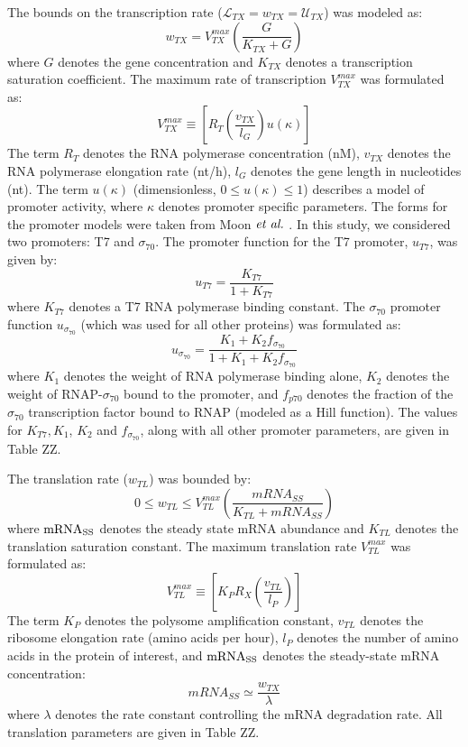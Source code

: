 \documentclass[journal=asbcd6,manuscript=article]{achemso}
\begin{document}
The bounds on the transcription rate ($\mathcal{L}_{TX}=w_{TX}=\mathcal{U}_{TX}$) was modeled as:
\begin{equation}
	w_{TX} = V_{TX}^{max}\left(\frac{G}{K_{TX}+G}\right)
\end{equation}
where $G$ denotes the gene concentration and $K_{TX}$ denotes a transcription saturation coefficient.
The maximum rate of transcription $V_{TX}^{max}$ was formulated as:
\begin{equation}
	V_{TX}^{max} \equiv \left[R_{T}\left(\frac{v_{TX}}{l_{G}}\right)u\left(\kappa\right)\right]
\end{equation}
The term $R_{T}$ denotes the RNA polymerase concentration (nM),
$v_{TX}$ denotes the RNA polymerase elongation rate (nt/h),
$l_{G}$ denotes the gene length in nucleotides (nt).
The term $u\left(\kappa\right)$ (dimensionless, $0\leq u\left(\kappa\right)\leq 1$) describes a model of promoter activity, where $\kappa$ denotes promoter specific parameters.
The forms for the promoter models were taken from Moon $\emph{et~al.}$ \cite{Moon:2012ab}.
In this study, we considered two promoters: T7 and $\sigma_{70}$.
The promoter function for the T7 promoter, $u_{T7}$, was given by:
\begin{equation}
	u_{T7} = \frac{K_{T7}}{1 + K_{T7}}
\end{equation}
where $K_{T7}$ denotes a T7 RNA polymerase binding constant.
The $\sigma_{70}$ promoter function $u_{\sigma_{70}}$ (which was used for all other proteins) was formulated as:
\begin{equation}
	u_{\sigma_{70}} = \frac{K_{1}+K_{2}f_{\sigma_{70}}}{1 + K_{1}+K_{2}f_{\sigma_{70}}}
\end{equation}
where $K_{1}$ denotes the weight of RNA polymerase binding alone,
$K_{2}$ denotes the weight of RNAP-$\sigma_{70}$ bound to the promoter,
and $f_{p70}$ denotes the fraction of the $\sigma_{70}$ transcription factor bound to RNAP (modeled as a Hill function).
The values for $K_{T7}, K_{1}$, $K_{2}$ and $f_{\sigma_{70}}$, along with all other promoter parameters, are given in Table ZZ.

The translation rate ($w_{TL}$) was bounded by:
 \begin{equation}
	0\leq w_{TL} \leq V_{TL}^{max}\left(\frac{mRNA_{SS}}{K_{TL}+mRNA_{SS}}\right)
\end{equation}
where $\rm mRNA_{SS}$ denotes the steady state mRNA abundance and $K_{TL}$ denotes the translation saturation constant.
The maximum translation rate $V_{TL}^{max}$ was formulated as:
\begin{equation}
	V_{TL}^{max} \equiv \left[K_{P} R_{X}\left(\frac{v_{TL}}{l_{P}}\right)\right]
\end{equation}
The term $K_{P}$ denotes the polysome amplification constant,
$v_{TL}$ denotes the ribosome elongation rate (amino acids per hour),
$l_{P}$ denotes the number of amino acids in the protein of interest,
and $\rm mRNA_{SS}$ denotes the steady-state mRNA concentration:
\begin{equation}
	 mRNA_{SS}\simeq\frac{w_{TX}}{\lambda}
\end{equation}
where $\lambda$ denotes the rate constant controlling the mRNA degradation rate.
All translation parameters are given in Table ZZ.
\end{document}
